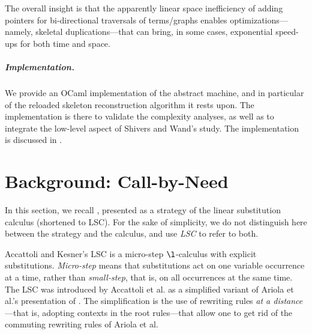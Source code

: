 The overall insight is that the apparently linear space inefficiency of adding pointers for bi-directional traversals of terms/graphs enables optimizations---namely, skeletal duplications---that can bring, in some cases, exponential speed-ups for both time and space. 







\subparagraph{Implementation.} We provide an OCaml implementation of the abstract machine, and in particular of the reloaded skeleton reconstruction algorithm it rests upon. The implementation is there to  validate the complexity analyses, as well as to integrate the low-level aspect of Shivers and Wand's study. 
The implementation is discussed in .




\section{Background: Call-by-Need}
\label{sect:cbneed}

In this section, we recall \cbneed, presented as a strategy of the \cbneed linear substitution calculus (shortened to LSC). For the sake of simplicity, we do not distinguish here between the strategy and the calculus, and use \emph{\cbneed LSC} to refer to both.

 Accattoli and Kesner's LSC \cite{DBLP:conf/rta/Accattoli12,DBLP:conf/popl/AccattoliBKL14} is a micro-step $\l$-calculus with explicit substitutions. \emph{Micro-step} means that substitutions act on one variable occurrence at a time, rather than \emph{small-step}, that is, on all occurrences at the same time. The \cbneed LSC was introduced by  Accattoli et al. \cite{DBLP:conf/icfp/AccattoliBM14} as a simplified variant of Ariola et al.'s presentation of \cbneed \cite{DBLP:conf/popl/AriolaFMOW95}. The simplification is the use of rewriting rules \emph{at a distance}---that is, adopting contexts in the root rules---that allow one to get rid of the commuting rewriting rules of Ariola et al.







